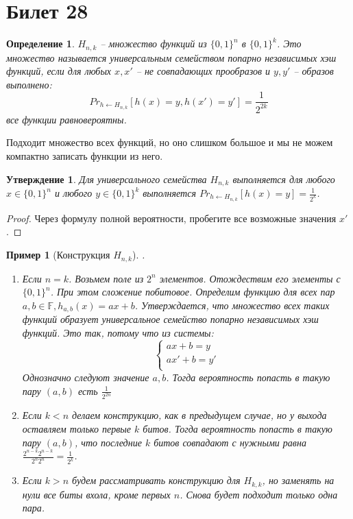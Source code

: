 \documentclass[12pt, letterpaper]{article}
\newtheorem{prop}{Утверждение}[section]
\newtheorem{defi}{Определение}[section]
\newtheorem{sample}{Пример}[section]
\newcommand{\Ff}{\mathbb{F}}
\begin{document}
\section{Билет 28}
\begin{defi}
$H_{n,k}$ -- множество функций из $\{0,1\}^n$ в $\{0,1\}^k$. Это множество называется универсальным семейством попарно независимых хэш функций, если для любых $x, x'$ -- не совпадающих прообразов и $y, y'$ -- образов выполнено:
$$ Pr_{h \leftarrow H_{n,k}}[h(x)=y, h(x')=y'] = \frac1{2^{2k}}$$ все функции равновероятны.
\end{defi}
Подходит множество всех функций, но оно слишком большое и мы не можем компактно записать функции из него.
\begin{prop}
Для универсального семейства $H_{n,k}$ выполняется для любого $x \in \{0,1\}^n$ и любого $y \in \{0,1\}^k$ выполняется $Pr_{h \leftarrow H_{n,k}} [h(x)=y] = \frac1{2^k}$.
\end{prop}
\begin{proof}
Через формулу полной вероятности, пробегите все возможные значения $x'$.
\end{proof}
\begin{sample}[Конструкция $H_{n,k}$].
\begin{enumerate}
\item Если $n=k$. Возьмем поле из $2^n$ элементов. Отождествим его элементы с $\{0,1\}^n$. При этом сложение побитовое. Определим функцию для всех пар $a,b \in \Ff, h_{a,b}(x)=ax+b$. Утверждается, что множество всех таких функций образует универсальное семейство попарно независимых хэш функций. Это так, потому что из системы:
$$
\begin{cases}
ax+b=y \\
ax'+b=y' \\
\end{cases}
$$  
Однозначно следуют значение $a,b$. Тогда вероятность попасть в такую пару $(a,b)$ есть $\frac{1}{2^{2n}}$
\item Если $k<n$ делаем конструкцию, как в предыдущем случае, но у выхода оставляем только первые $k$ битов. Тогда вероятность попасть в такую пару $(a,b)$, что последние $k$ битов совпадают с нужными равна $\frac{2^{n-k} 2^{n-k}}{2^n 2^n} = \frac1{2^k}$.
\item Если $k > n$ будем рассматривать конструкцию для $H_{k,k}$, но заменять на нули все биты вхола, кроме первых $n$. Снова будет подходит только одна пара.
\end{enumerate}
\end{sample}
\end{document}
